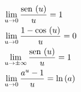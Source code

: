 \documentclass{article}
\begin{document}
    \begin{align}
        & \lim_{u \to 0}{\dfrac{\sen u}{u}} = 1 \\
        & \lim_{u \to 0}{\dfrac{1 - \cos u}{u}} = 0 \\
        & \lim_{u \to \pm \infty}{\dfrac{\sen u}{u}} = 1 \\
        & \lim_{u \to 0}{\dfrac{a^u - 1}{u}} = \ln a 
    \end{align}
\end{document}
